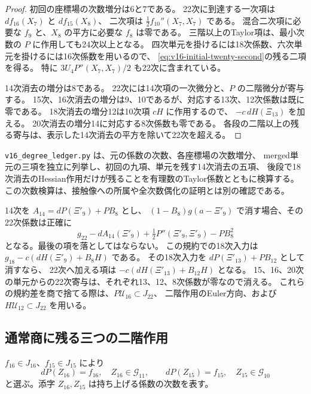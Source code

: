 \begin{proof}
初回の座標場の次数増分は6と7である。
22次に到達する一次項は $df_{16}(X_7)$ と $df_{15}(X_8)$、
二次項は $\tfrac12 f_{10}''(X_7,X_7)$ である。
混合二次項に必要な $f_9$ と、$X_8$ の平方に必要な $f_8$ は零である。
三階以上のTaylor項は、最小次数の $P$ に作用しても24次以上となる。
四次単元を掛けるには18次係数、六次単元を掛けるには16次係数を用いるので、
\eqref{eq:v16-initial-twenty-second}の残る二項を得る。
特に $3U_4P''(X_7,X_7)/2$ も22次に含まれている。

14次消去の増分は8である。
22次には14次項の一次微分と、$P$ の二階微分が寄与する。
15次、16次消去の増分は9、10であるが、対応する13次、12次係数は既に零である。
18次消去の増分12は10次項 $cH$ に作用するので、
$-c\,dH(\Xi_{13})$ を加える。
20次消去の増分14に対応する8次係数も零である。
各段の二階以上の残る寄与は、表示した14次消去の平方を除いて22次を超える。
\end{proof}

\nolinkurl{v16_degree_ledger.py} は、元の係数の次数、各座標場の次数増分、
merged単元の三項を独立に列挙し、初回の九項、単元を残す14次消去の五項、
後段で18次消去のHessian作用だけが残ることを有理数のTaylor係数とともに検算する。
この次数検算は、接触像への所属や全次数偶化の証明とは別の確認である。

\begin{remark}[単元を残す規約での同じ台帳]
14次を $A_{14}=dP(\Xi'_9)+PB_8$ とし、
$(1-B_8)g(a-\Xi'_9)$ で消す場合、その22次係数は正確に
\[
 g_{22}-dA_{14}(\Xi'_9)+\tfrac12P''(\Xi'_9,\Xi'_9)-PB_8^2
\]
となる。最後の項を落としてはならない。
この規約での18次入力は $g_{18}-c(dH(\Xi'_9)+B_8H)$ である。
その18次入力を $dP(\Xi'_{13})+PB_{12}$ として消すなら、
22次へ加える項は $-c(dH(\Xi'_{13})+B_{12}H)$ となる。
15、16、20次の単元からの22次寄与は、それぞれ13、12、8次係数が零なので消える。
これらの規約差を商で捨てる際は、$P\mathcal U_{16}\subset J_{22}$、
二階作用のEuler方向、および $H\mathcal U_{12}\subset J_{22}$ を用いる。
\end{remark}

\subsection{通常商に残る三つの二階作用}

$f_{16}\in J_{16}$、$f_{15}\in J_{15}$ により
\[
 dP(Z_{16})=f_{16},\quad Z_{16}\in\mathcal G_{11},\qquad
 dP(Z_{15})=f_{15},\quad Z_{15}\in\mathcal G_{10}
\]
と選ぶ。添字 $Z_{16},Z_{15}$ は持ち上げる係数の次数を表す。

